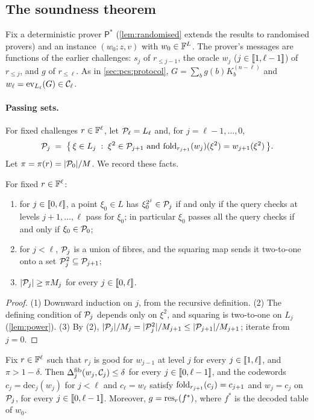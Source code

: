 \subsection{The soundness theorem}\label{sec:sound:thm}

Fix a deterministic prover $\mathsf{P}^*$ (\cref{lem:randomised} extends the results to randomised provers) and an instance $(w_0; z, v)$ with $w_0 \in \mathbb{F}^L$.
The prover's messages are functions of the earlier challenges: $s_j$ of $r_{\le j-1}$, the oracle $w_j$ ($j \in \llbracket 1, \ell-1 \rrbracket$) of $r_{\le j}$, and $g$ of $r_{\le \ell}$.
As in \cref{sec:pcs:protocol}, $G = \sum_b g(b) K^{(n-\ell)}_b$ and $w_\ell = \mathrm{ev}_{L_\ell}(G) \in \mathcal{C}_\ell$.

\paragraph{Passing sets.}
For fixed challenges $r \in \mathbb{F}^\ell$, let $\mathcal{P}_\ell = L_\ell$ and, for $j = \ell-1, \dots, 0$,
\[
  \mathcal{P}_j \;=\; \bigl\{\, \xi \in L_j \;:\; \xi^2 \in \mathcal{P}_{j+1} \text{ and } \mathrm{fold}_{r_{j+1}}(w_j)(\xi^2) = w_{j+1}(\xi^2) \,\bigr\}.
\]
Let $\pi = \pi(r) = |\mathcal{P}_0|/M$. We record these facts.

\begin{lemma}\label{lem:passing}
For fixed $r \in \mathbb{F}^\ell$:
\begin{enumerate}
  \item for $j \in \llbracket 0, \ell \rrbracket$, a point $\xi_0 \in L$ has $\xi_0^{2^j} \in \mathcal{P}_j$ if and only if the query checks at levels $j+1,\dots,\ell$ pass for $\xi_0$; in particular $\xi_0$ passes all the query checks if and only if $\xi_0 \in \mathcal{P}_0$;
  \item for $j < \ell$, $\mathcal{P}_j$ is a union of fibres, and the squaring map sends it two-to-one onto a set $\mathcal{P}_j^2 \subseteq \mathcal{P}_{j+1}$;
  \item $|\mathcal{P}_j| \ge \pi M_j$ for every $j \in \llbracket 0, \ell \rrbracket$.
\end{enumerate}
\end{lemma}

\begin{proof}
(1) Downward induction on $j$, from the recursive definition. (2) The defining condition of $\mathcal{P}_j$ depends only on $\xi^2$, and squaring is two-to-one on $L_j$ (\cref{lem:power}). (3) By (2), $|\mathcal{P}_j|/M_j = |\mathcal{P}_j^2|/M_{j+1} \le |\mathcal{P}_{j+1}|/M_{j+1}$; iterate from $j = 0$.
\end{proof}

\begin{lemma}\label{lem:chain}
Fix $r \in \mathbb{F}^\ell$ such that $r_j$ is good for $w_{j-1}$ at level $j$ for every $j \in \llbracket 1, \ell \rrbracket$, and $\pi > 1-\delta$.
Then $\Delta^{\mathrm{fib}}_j(w_j, \mathcal{C}_j) \le \delta$ for every $j \in \llbracket 0, \ell-1 \rrbracket$, and the codewords $c_j = \mathrm{dec}_j(w_j)$ for $j < \ell$ and $c_\ell = w_\ell$ satisfy $\mathrm{fold}_{r_{j+1}}(c_j) = c_{j+1}$ and $w_j = c_j$ on $\mathcal{P}_j$, for every $j \in \llbracket 0, \ell-1 \rrbracket$.
Moreover, $g = \mathrm{res}_r(f^*)$, where $f^*$ is the decoded table of $w_0$.
\end{lemma}

